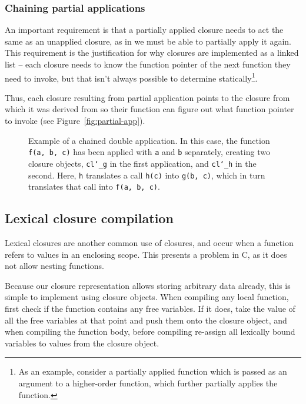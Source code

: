 \subsubsection{Chaining partial applications}

An important requirement is that a partially applied closure needs to act the
same as an unapplied closure, as in we must be able to partially apply it again.
This requirement is the justification for why closures are implemented as 
a linked list -- each closure needs to know the function pointer of the next 
function they need to invoke, but that isn't always possible to determine 
statically\footnote{As an example, consider a partially applied function which 
is passed as an argument to a higher-order function, which further partially 
applies the function.}.

Thus, each closure resulting from partial application points to the closure from
which it was derived from so their function can figure out what function pointer
to invoke (see Figure~\ref{fig:partial-app}).

\begin{figure}
    \centering
    
    \caption{Example of a chained double application. In this case, the 
    function \texttt{f(a, b, c)} has been applied with \texttt{a} and 
    \texttt{b} separately, creating two closure objects, \texttt{cl\char`_g} in 
    the first application, and \texttt{cl\char`_h} in the second. Here, 
    \texttt{h} translates a call \texttt{h(c)} into \texttt{g(b, c)}, which in 
    turn translates that call into \texttt{f(a, b, c)}.}\label{fig:double-partial-app}
\end{figure}

\subsection{Lexical closure compilation}

Lexical closures are another common use of closures, and occur when a function
refers to values in an enclosing scope. This presents a problem in C, as it does
not allow nesting functions.

Because our closure representation allows storing arbitrary data already, this
is simple to implement using closure objects. When compiling any local function,
first check if the function contains any free variables. If it does, take the
value of all the free variables at that point and push them onto the closure
object, and when compiling the function body, before compiling re-assign all
lexically bound variables to values from the closure object.

